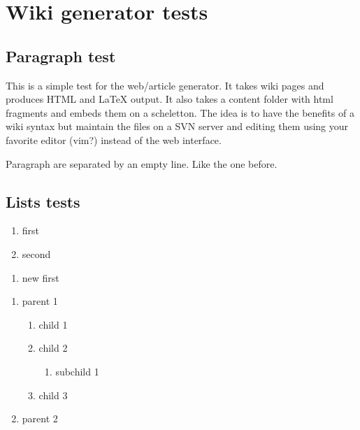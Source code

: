
\chapter{Wiki generator tests}

\section{Paragraph test}
This is a simple test for the web/article generator.
It takes wiki pages and produces HTML and LaTeX output.
It also takes a content folder with html fragments and
embeds them on a scheletton.
The idea is to have the benefits of a wiki syntax
but maintain the files on a SVN server and editing
them using your favorite editor (vim?) instead of
the web interface.

Paragraph are separated by an empty line.
Like the one before.

\section{Lists tests}


\begin{enumerate}
	\item  first
	\item  second
\end{enumerate}

\begin{enumerate}
	\item  new first
\end{enumerate}

\begin{enumerate}
	\item  parent 1
	\begin{enumerate}
		\item  child 1
		\item  child 2
		\begin{enumerate}
			\item  subchild 1
		\end{enumerate}
		\item  child 3
	\end{enumerate}
	\item  parent 2
\end{enumerate}


